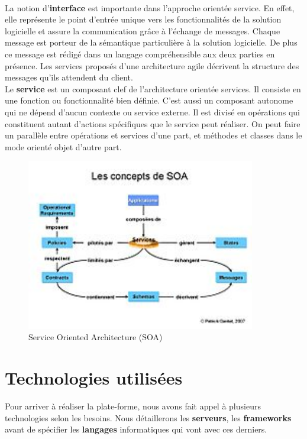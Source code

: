 \documentclass[12pt]{report}
\begin{document}
	      \paragraph{}
		La notion d’\textbf{interface} est importante dans l’approche orientée service. En effet, elle représente le point d’entrée unique vers les fonctionnalités de la solution logicielle et assure la communication grâce à l’échange de messages. Chaque message est porteur de la sémantique particulière à la solution logicielle. De plus ce message est rédigé dans un langage compréhensible aux deux parties en présence. Les services proposés d’une architecture agile décrivent la structure des messages qu’ils attendent du client.
		\\Le \textbf{service} est un composant clef de l'architecture orientée services. Il consiste en une fonction ou fonctionnalité bien définie. C'est aussi un composant autonome qui ne dépend d’aucun contexte ou service externe. Il est divisé en opérations qui constituent autant d'actions spécifiques que le service peut réaliser. On peut faire un parallèle entre opérations et services d'une part, et méthodes et classes dans le mode orienté objet d'autre part.

	  \begin{figure}[H]
	    \begin{center}
	      \includegraphics[scale=0.6, width=10cm]{images/soa.JPG}
	      \caption{Service Oriented Architecture (SOA)}
	    \end{center}
	  \end{figure}
      
      \section{Technologies utilisées}
	Pour arriver à réaliser la plate-forme, nous avons fait appel à plusieurs technologies selon les besoins. Nous détaillerons les \textbf{serveurs}, les \textbf{frameworks} avant de spécifier les \textbf{langages} informatiques qui vont avec ces derniers.
	
\end{document}
